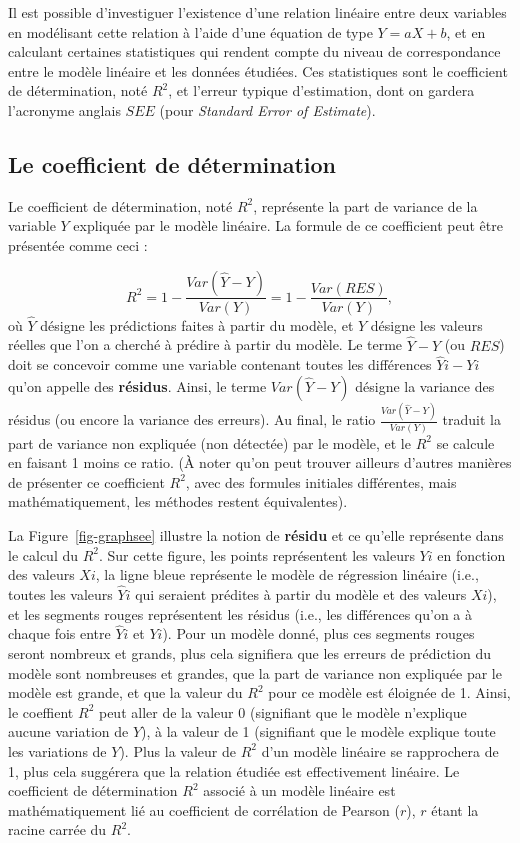 \documentclass[
  letterpaper,
]{book}
\begin{document}
Il est possible d'investiguer l'existence d'une relation linéaire entre
deux variables en modélisant cette relation à l'aide d'une équation de
type \(Y = aX + b\), et en calculant certaines statistiques qui rendent
compte du niveau de correspondance entre le modèle linéaire et les
données étudiées. Ces statistiques sont le coefficient de détermination,
noté \(R^2\), et l'erreur typique d'estimation, dont on gardera
l'acronyme anglais \(SEE\) (pour \emph{Standard Error of Estimate}).

\subsection{Le coefficient de
détermination}\label{le-coefficient-de-duxe9termination}

Le coefficient de détermination, noté \(R^2\), représente la part de
variance de la variable \(Y\) expliquée par le modèle linéaire. La
formule de ce coefficient peut être présentée comme ceci :

\[R^2 = 1 - {\frac {Var(\hat{Y} - Y) } {Var(Y)}} = 1 - {\frac {Var(RES)} {Var(Y)}}, \]
où \(\hat{Y}\) désigne les prédictions faites à partir du modèle, et
\(Y\) désigne les valeurs réelles que l'on a cherché à prédire à partir
du modèle. Le terme \(\hat{Y} - Y\) (ou \(RES\)) doit se concevoir comme
une variable contenant toutes les différences \(\hat{Y}{i} - Y{i}\)
qu'on appelle des \textbf{résidus}. Ainsi, le terme
\({Var(\hat{Y} - Y) }\) désigne la variance des résidus (ou encore la
variance des erreurs). Au final, le ratio
\({\frac {Var(\hat{Y} - Y) } {Var(Y)}}\) traduit la part de variance non
expliquée (non détectée) par le modèle, et le \(R^2\) se calcule en
faisant 1 moins ce ratio. (À noter qu'on peut trouver ailleurs d'autres
manières de présenter ce coefficient \(R^2\), avec des formules
initiales différentes, mais mathématiquement, les méthodes restent
équivalentes).

La Figure~\ref{fig-graphsee} illustre la notion de \textbf{résidu} et ce
qu'elle représente dans le calcul du \(R^2\). Sur cette figure, les
points représentent les valeurs \(Y{i}\) en fonction des valeurs
\(X{i}\), la ligne bleue représente le modèle de régression linéaire
(i.e., toutes les valeurs \(\hat{Y}{i}\) qui seraient prédites à partir
du modèle et des valeurs \(X{i}\)), et les segments rouges représentent
les résidus (i.e., les différences qu'on a à chaque fois entre
\(\hat{Y}{i}\) et \(Y{i}\)). Pour un modèle donné, plus ces segments
rouges seront nombreux et grands, plus cela signifiera que les erreurs
de prédiction du modèle sont nombreuses et grandes, que la part de
variance non expliquée par le modèle est grande, et que la valeur du
\(R^2\) pour ce modèle est éloignée de 1. Ainsi, le coeffient \(R^2\)
peut aller de la valeur 0 (signifiant que le modèle n'explique aucune
variation de \(Y\)), à la valeur de 1 (signifiant que le modèle explique
toute les variations de \(Y\)). Plus la valeur de \(R^2\) d'un modèle
linéaire se rapprochera de 1, plus cela suggérera que la relation
étudiée est effectivement linéaire. Le coefficient de détermination
\(R^2\) associé à un modèle linéaire est mathématiquement lié au
coefficient de corrélation de Pearson (\(r\)), \(r\) étant la racine
carrée du \(R^2\).
\end{document}
